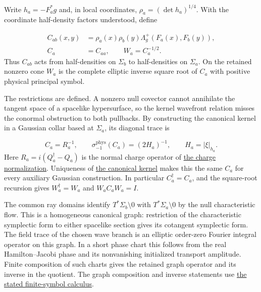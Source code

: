 \documentclass[
  english,
  11pt,
  reqno]{amsart}
\begin{document}
Write \(h_a=-F_a^*g\) and, in local coordinates,
\(\rho_a=(\det h_a)^{1/4}\). With the coordinate half-density factors
understood, define

\label{eq:online-wave-carrier-covariances} \[
\begin{aligned}
C_{ab}(x,y)
&=\rho_a(x)\rho_b(y)
  \Lambda_g^+(F_a(x),F_b(y)),\\
C_a&=C_{aa},\qquad W_a=C_a^{-1/2}.
\end{aligned}
\] Thus \(C_{ab}\) acts from half-densities on \(\Sigma_b\) to
half-densities on \(\Sigma_a\). On the retained nonzero cone \(W_a\) is
the complete elliptic inverse square root of \(C_a\) with positive
physical principal symbol.

The restrictions are defined. A nonzero null covector cannot annihilate
the tangent space of a spacelike hypersurface, so the kernel wavefront
relation misses the conormal obstruction to both pullbacks. By
constructing the canonical kernel in a Gaussian collar based at
\(\Sigma_a\), its diagonal trace is

\label{eq:online-wave-carrier-diagonal-symbol} \[
C_a=R_a^{-1},\qquad
\sigma_{-1}^{\mathrm{phys}}(C_a)=(2H_a)^{-1},
\qquad H_a=|\xi|_{h_a}.
\] Here \(R_a=i(Q_a^\dagger-Q_a)\) is the normal charge operator of
\hyperref[prop:online-wave-charge-normalization]{the charge
normalization}. Uniqueness of
\hyperref[thm:online-canonical-wave-kernel]{the canonical kernel} makes
this the same \(C_a\) for every auxiliary Gaussian construction. In
particular \(C_a^\dagger=C_a\), and the square-root recursion gives
\(W_a^\dagger=W_a\) and \(W_aC_aW_a=I\).

The common ray domains identify \(T^*\Sigma_b\setminus0\) with
\(T^*\Sigma_a\setminus0\) by the null characteristic flow. This is a
homogeneous canonical graph: restriction of the characteristic
symplectic form to either spacelike section gives its cotangent
symplectic form. The field trace of the chosen wave branch is an
elliptic order-zero Fourier integral operator on this graph. In a short
phase chart this follows from the real Hamilton--Jacobi phase and its
nonvanishing initialized transport amplitude. Finite composition of such
charts gives the retained graph operator and its inverse in the
quotient. The graph composition and inverse statements use
\hyperref[lem:online-finite-symbol-family-calculus]{the stated
finite-symbol calculus}.
\end{document}
